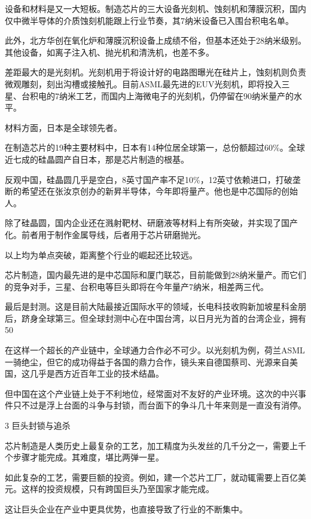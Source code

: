 \documentclass[utf8]{book}
\begin{document}
	设备和材料是又一大短板。制造芯片的三大设备光刻机、蚀刻机和薄膜沉积，国内仅中微半导体的介质蚀刻机能跟上行业节奏，其7纳米设备已入围台积电名单。

	此外，北方华创在氧化炉和薄膜沉积设备上成绩不俗，但基本还处于28纳米级别。其他设备，如离子注入机、抛光机和清洗机，也差不多。

	差距最大的是光刻机。光刻机用于将设计好的电路图曝光在硅片上，蚀刻机则负责微观雕刻，刻出沟槽或接触孔。目前ASML最先进的EUV光刻机，即将投入三星、台积电的7纳米工艺，而国内上海微电子的光刻机，仍停留在90纳米量产的水平。

	材料方面，日本是全球领先者。

	在制造芯片的19种主要材料中，日本有14种位居全球第一，总份额超过60\%。全球近七成的硅晶圆产自日本，那是芯片制造的根基。

	反观中国，硅晶圆几乎是空白，8英寸国产率不足10\%，12英寸依赖进口，打破垄断的希望还在张汝京创办的新昇半导体，今年即将量产。他也是中芯国际的创始人。

	除了硅晶圆，国内企业还在溅射靶材、研磨液等材料上有所突破，并实现了国产化。前者用于制作金属导线，后者用于芯片研磨抛光。

	以上均为单点突破，距离整个行业的崛起还比较远。

	芯片制造，国内最先进的是中芯国际和厦门联芯，目前能做到28纳米量产。而它们的竞争对手，三星、台积电等巨头即将在今年量产7纳米，相差两三代。

	最后是封测。这是目前大陆最接近国际水平的领域，长电科技收购新加坡星科金朋后，跻身全球第三。但全球封测中心在中国台湾，以日月光为首的台湾企业，拥有50%

	在这样一个超长的产业链中，全球通力合作必不可少。以光刻机为例，荷兰ASML一骑绝尘，但它的成功得益于各国的鼎力合作，镜头来自德国蔡司、光源来自美国，这几乎是西方近百年工业的技术结晶。

	但中国在这个产业链上处于不利地位，经常面对不友好的产业环境。这次的中兴事件只不过是浮上台面的斗争与封锁，而台面下的争斗几十年来则是一直没有消停。

	\begin{flushleft}
		{\Large 3 巨头封锁与追杀}
	\end{flushleft}


	芯片制造是人类历史上最复杂的工艺，加工精度为头发丝的几千分之一，需要上千个步骤才能完成。其难度，堪比两弹一星。

	如此复杂的工艺，需要巨额的投资。例如，建一个芯片工厂，就动辄需要上百亿美元。这样的投资规模，只有跨国巨头乃至国家才能完成。

	这让巨头企业在产业中更具优势，也直接导致了行业的不断集中。
\end{document}
